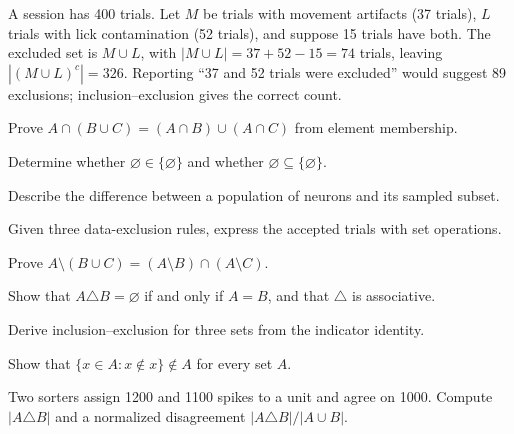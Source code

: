 \begin{workedexample}
A session has 400 trials. Let $M$ be trials with movement artifacts (37 trials), $L$ trials with lick contamination (52 trials), and suppose 15 trials have both. The excluded set is $M\cup L$, with $|M\cup L|=37+52-15=74$ trials, leaving $|(M\cup L)^c|=326$. Reporting ``37 and 52 trials were excluded'' would suggest 89 exclusions; inclusion--exclusion gives the correct count.
\end{workedexample}
\begin{exercises}
\item Prove $A\cap(B\cup C)=(A\cap B)\cup(A\cap C)$ from element membership.
\item Determine whether $\varnothing\in\{\varnothing\}$ and whether $\varnothing\subseteq\{\varnothing\}$.
\item Describe the difference between a population of neurons and its sampled subset.
\item Given three data-exclusion rules, express the accepted trials with set operations.
\item Prove $A\setminus(B\cup C)=(A\setminus B)\cap(A\setminus C)$.
\item Show that $A\triangle B=\varnothing$ if and only if $A=B$, and that $\triangle$ is associative.
\item Derive inclusion--exclusion for three sets from the indicator identity.
\item Show that $\{x\in A:x\notin x\}\notin A$ for every set $A$.
\item Two sorters assign 1200 and 1100 spikes to a unit and agree on 1000. Compute $|A\triangle B|$ and a normalized disagreement $|A\triangle B|/|A\cup B|$.
\end{exercises}
